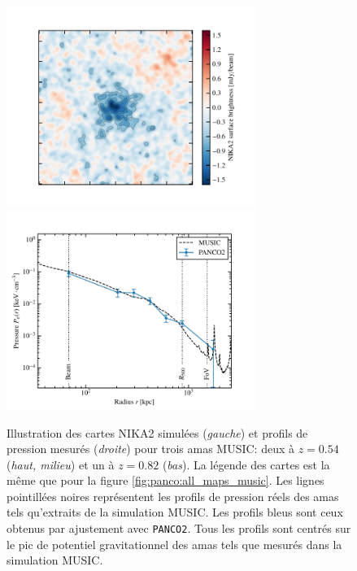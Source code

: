 \begin{figure}[p]
    \includegraphics[height=6.5cm, trim={1.4cm 0.5cm 0.8cm 1.0cm}, clip]{Figures/Chap_panco/profiles_music/Bin2_cl00047_map.pdf} \hspace{10pt}
    \includegraphics[height=6.5cm, trim={0cm 0cm 1cm 1.0cm}, clip]{Figures/Chap_panco/profiles_music_2/00047.0.82.pdf}
    \caption{Illustration des cartes NIKA2 simulées (\textit{gauche}) et profils de pression mesurés (\textit{droite}) pour trois amas MUSIC: deux à $z=0.54$(\textit{haut, milieu}) et un à $z=0.82$ (\textit{bas}).
        La légende des cartes est la même que pour la figure \ref{fig:panco:all_maps_music}.
        Les lignes pointillées noires représentent les profils de pression réels des amas tels qu'extraits de la simulation MUSIC.
        Les profils bleus sont ceux obtenus par ajustement avec \texttt{PANCO2}.
        Tous les profils sont centrés sur le pic de potentiel gravitationnel des amas tels que mesurés dans la simulation MUSIC.
    }
    \label{fig:panco:music_profs}
\end{figure}

